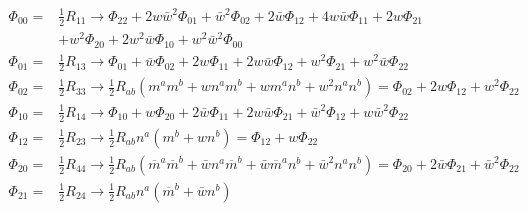 \begin{align*}
    \Phi_{00}=& \frac{1}{2} R_{11} \to 
    \Phi_{22} + 2w\bar{w}^2\Phi_{01}  + \bar{w}^2 \Phi_{02}
    + 2\bar{w} \Phi_{12} + 4w\bar{w} \Phi_{11} + 2w \Phi_{21} \\
    & + w^2 \Phi_{20} + 2w^2\bar{w} \Phi_{10}  + w^2\bar{w}^2 \Phi_{00}   \\
    \Phi_{01}=& \frac{1}{2} R_{13} \to 
    \Phi_{01}+\bar{w}\Phi_{02}+2w\Phi_{11} +2w\bar{w}\Phi_{12}
    +w^2 \Phi_{21} + w^2\bar{w} \Phi_{22} \\
    \Phi_{02}=& \frac{1}{2} R_{33} \to
    \frac{1}{2}R_{ab}(m^am^b + w n^am^b+ wm^an^b + w^2 n^an^b)
    =\Phi_{02}+ 2w\Phi_{12} + w^2 \Phi_{22} \\
    \Phi_{10}=& \frac{1}{2} R_{14} \to 
    \Phi_{10}+{w}\Phi_{20}+2\bar{w}\Phi_{11} +2w\bar{w}\Phi_{21}
    +\bar{w}^2 \Phi_{12} + w\bar{w}^2 \Phi_{22} \\
    \Phi_{12}=& \frac{1}{2} R_{23} \to  \frac{1}{2}R_{ab} n^a (m^b+w n^b)
    = \Phi_{12} + w \Phi_{22}\\
    \Phi_{20}=& \frac{1}{2} R_{44} \to \frac{1}{2}R_{ab}
    (\overline{m}^a\overline{m}^b + \bar{w} n^a\overline{m}^b
    +\bar{w}\overline{m}^an^b + \bar{w}^2 n^an^b)
    =\Phi_{20}+ 2\bar{w}\Phi_{21} + \bar{w}^2 \Phi_{22} \\
    \Phi_{21}=& \frac{1}{2} R_{24} \to  \frac{1}{2}R_{ab} n^a (\overline{m}^b+\bar{w} n^b)

\end{align*}
